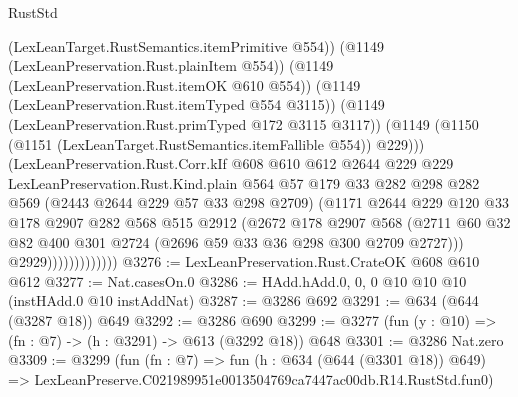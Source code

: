 \begin{lexlean}{RustStd}
\begin{coremodule}
                              (LexLeanTarget.RustSemantics.itemPrimitive @554))
                            (@1149 (LexLeanPreservation.Rust.plainItem @554))
                            (@1149 (LexLeanPreservation.Rust.itemOK @610 @554))
                            (@1149 (LexLeanPreservation.Rust.itemTyped @554 @3115))
                            (@1149 (LexLeanPreservation.Rust.primTyped @172 @3115 @3117))
                            (@1149
                              (@1150 (@1151 (LexLeanTarget.RustSemantics.itemFallible @554)) @229)))
                          (LexLeanPreservation.Rust.Corr.kIf
                            @608
                            @610
                            @612
                            @2644
                            @229
                            @229
                            LexLeanPreservation.Rust.Kind.plain
                            @564
                            @57
                            @179
                            @33
                            @282
                            @298
                            @282
                            @569
                            (@2443 @2644 @229 @57 @33 @298 @2709)
                            (@1171
                              @2644
                              @229
                              @120
                              @33
                              @178
                              @2907
                              @282
                              @568
                              @515
                              @2912
                              (@2672
                                @178
                                @2907
                                @568
                                (@2711
                                  @60
                                  @32
                                  @82
                                  @400
                                  @301
                                  @2724
                                  (@2696 @59 @33 @36 @298 @300 @2709 @2727)))
                              @2929)))))))))))))
@3276 := LexLeanPreservation.Rust.CrateOK @608 @610 @612
@3277 := Nat.casesOn.{0}
@3286 := HAdd.hAdd.{0, 0, 0} @10 @10 @10 (instHAdd.{0} @10 instAddNat)
@3287 := @3286 @692
@3291 := @634 (@644 (@3287 @18)) @649
@3292 := @3286 @690
@3299 := @3277 (fun (y : @10) => (fn : @7) -> (h : @3291) -> @613 (@3292 @18)) @648
@3301 := @3286 Nat.zero
@3309 := @3299
    (fun (fn : @7) =>
    fun (h : @634 (@644 (@3301 @18)) @649) =>
    LexLeanPreserve.C021989951e0013504769ca7447ac00db.R14.RustStd.fun0)

\end{coremodule}
\end{lexlean}
